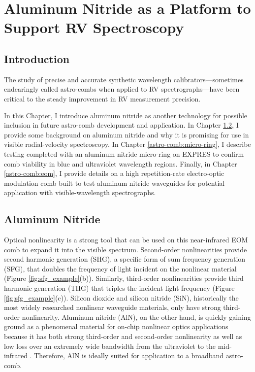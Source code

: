 \chapter{Aluminum Nitride as a Platform to Support RV Spectroscopy} \label{chapter:astro-comb}

\section{Introduction} \label{astro-comb:intro}

The study of precise and accurate synthetic wavelength calibrators---sometimes endearingly called astro-combs when applied to RV spectrographs---have been critical to the steady improvement in RV measurement precision.

In this Chapter, I introduce aluminum nitride as another technology for possible inclusion in future astro-comb development and application. In Chapter \ref{astro-comb:aln}, I provide some background on aluminum nitride and why it is promising for use in visible radial-velocity spectroscopy. In Chapter \ref{astro-comb:micro-ring}, I describe testing completed with an aluminum nitride micro-ring on EXPRES to confirm comb viability in blue and ultraviolet wavelength regions. Finally, in Chapter \ref{astro-comb:eom}, I provide details on a high repetition-rate electro-optic modulation comb built to test aluminum nitride waveguides for potential application with visible-wavelength spectrographs.

\section{Aluminum Nitride} \label{astro-comb:aln}



Optical nonlinearity is a strong tool that can be used on this near-infrared EOM comb to expand it into the visible spectrum. Second-order nonlinearities provide second harmonic generation (SHG), a specific form of sum frequency generation (SFG), that doubles the frequency of light incident on the nonlinear material (Figure \ref{fig:sfg_example}(b)). Similarly, third-order nonlinearities provide third harmonic generation (THG) that triples the incident light frequency (Figure \ref{fig:sfg_example}(c)). Silicon dioxide and silicon nitride (SiN), historically the most widely researched nonlinear waveguide materials, only have strong third-order nonlinearity. Aluminum nitride (AlN), on the other hand, is quickly gaining ground as a phenomenal material for on-chip nonlinear optics applications because it has both strong third-order and second-order nonlinearity as well as low loss over an extremely wide bandwidth from the ultraviolet to the mid-infrared \citep{Jung2016}. Therefore, AlN is ideally suited for application to a broadband astro-comb.

